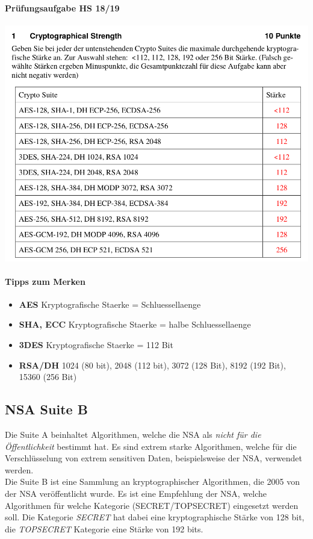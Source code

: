 \paragraph{Prüfungsaufgabe HS 18/19} \hfill
\newline
\begin{minipage}[t]{1\textwidth}
    \centering
	\includegraphics[width=0.95\linewidth]{images/hs18-19-crypto-strength.png}
\end{minipage}
\paragraph{Tipps zum Merken}
\begin{itemize}
    \item \textbf{AES} Kryptografische Staerke = Schluessellaenge
    \item \textbf{SHA, ECC} Kryptografische Staerke = halbe Schluessellaenge
    \item \textbf{3DES} Kryptografische Staerke = 112 Bit
    \item \textbf{RSA/DH} 1024 (80 bit), 2048 (112 bit), 3072 (128 Bit), 8192 (192 Bit), 15360 (256 Bit)
\end{itemize}

\subsection{NSA Suite B}
Die Suite A beinhaltet Algorithmen, welche die NSA als \textit{nicht für die Öffentlichkeit} bestimmt hat. Es sind extrem starke Algorithmen, welche für die Verschlüsselung von extrem sensitiven Daten, beispielsweise der NSA, verwendet werden.\\
Die Suite B ist eine Sammlung an kryptographischer Algorithmen, die 2005 von der NSA veröffentlicht wurde. Es ist eine Empfehlung der NSA, welche Algorithmen für welche Kategorie (SECRET/TOPSECRET) eingesetzt werden soll. Die Kategorie \textit{SECRET} hat dabei eine kryptographische Stärke von 128 bit, die \textit{TOPSECRET} Kategorie eine Stärke von 192 bits.

